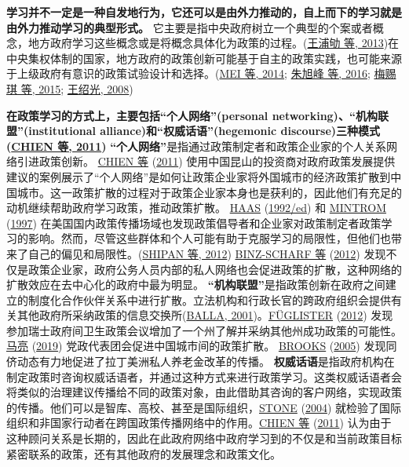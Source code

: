 \documentclass[
  12pt,
]{ctexart}
\begin{document}
\textbf{学习并不一定是一种自发地行为，它还可以是由外力推动的，自上而下的学习就是由外力推动学习的典型形式。}
它主要是指中央政府树立一个典型的个案或者概念，地方政府学习这些概念或是将概念具体化为政策的过程。(\protect\hyperlink{ref-WangPuQuLaiXianJin2013}{王浦劬 等, 2013})在中央集权体制的国家，地方政府的政策创新可能基于自主的政策实践，也可能来源于上级政府有意识的政策试验设计和选择。(\protect\hyperlink{ref-MeiLiu2014}{MEI 等, 2014}; \protect\hyperlink{ref-ZhuXuFengZhaoHui2016}{朱旭峰 等, 2016}; \protect\hyperlink{ref-MeiSiQiEtAl2015}{梅赐琪 等, 2015}; \protect\hyperlink{ref-WangShaoGuang2008a}{王绍光, 2008})

\textbf{在政策学习的方式上，主要包括``个人网络''(personal networking)、``机构联盟''(institutional alliance)和``权威话语''(hegemonic discourse)三种模式(\protect\hyperlink{ref-CHIENHo2011}{CHIEN 等, 2011})}
\textbf{``个人网络''}是指通过政策制定者和政策企业家的个人关系网络引进政策创新。
\protect\hyperlink{ref-CHIENHo2011}{CHIEN 等} (\protect\hyperlink{ref-CHIENHo2011}{2011}) 使用中国昆山的投资商对政府政策发展提供建议的案例展示了``个人网络''是如何让政策企业家将外国城市的经济政策扩散到中国城市。这一政策扩散的过程对于政策企业家本身也是获利的，因此他们有充足的动机继续帮助政府学习政策，推动政策扩散。
\protect\hyperlink{ref-Haas1992}{HAAS} (\protect\hyperlink{ref-Haas1992}{1992/ed}) 和 \protect\hyperlink{ref-Mintrom1997}{MINTROM} (\protect\hyperlink{ref-Mintrom1997}{1997}) 在美国国内政策传播场域也发现政策倡导者和企业家对政策制定者政策学习的影响。然而，尽管这些群体和个人可能有助于克服学习的局限性，但他们也带来了自己的偏见和局限性。(\protect\hyperlink{ref-ShipanVolden2012}{SHIPAN 等, 2012})
\protect\hyperlink{ref-Binz-ScharfEtAl2012}{BINZ-SCHARF 等} (\protect\hyperlink{ref-Binz-ScharfEtAl2012}{2012}) 发现不仅是政策企业家，政府公务人员内部的私人网络也会促进政策的扩散，这种网络的扩散效应在去中心化的政府中最为明显。
\textbf{``机构联盟''}是指政策创新在政府之间建立的制度化合作伙伴关系中进行扩散。立法机构和行政长官的跨政府组织会提供有关其他政府所采纳政策的信息交换所(\protect\hyperlink{ref-Balla2001}{BALLA, 2001})。\protect\hyperlink{ref-Fuglister2012}{FÜGLISTER} (\protect\hyperlink{ref-Fuglister2012}{2012}) 发现参加瑞士政府间卫生政策会议增加了一个州了解并采纳其他州成功政策的可能性。 \protect\hyperlink{ref-MaLiang2019}{马亮} (\protect\hyperlink{ref-MaLiang2019}{2019}) 党政代表团会促进中国城市间的政策扩散。 \protect\hyperlink{ref-Brooks2005}{BROOKS} (\protect\hyperlink{ref-Brooks2005}{2005}) 发现同侪动态有力地促进了拉丁美洲私人养老金改革的传播。
\textbf{权威话语}是指政府机构在制定政策时咨询权威话语者，并通过这种方式来进行政策学习。这类权威话语者会将类似的治理建议传播给不同的政策对象，由此借助其咨询的客户网络，实现政策的传播。他们可以是智库、高校、甚至是国际组织，\protect\hyperlink{ref-Stone2004}{STONE} (\protect\hyperlink{ref-Stone2004}{2004}) 就检验了国际组织和非国家行动者在跨国政策传播网络中的作用。\protect\hyperlink{ref-CHIENHo2011}{CHIEN 等} (\protect\hyperlink{ref-CHIENHo2011}{2011}) 认为由于这种顾问关系是长期的，因此在此政府网络中政府学习到的不仅是和当前政策目标紧密联系的政策，还有其他政府的发展理念和政策文化。
\end{document}
